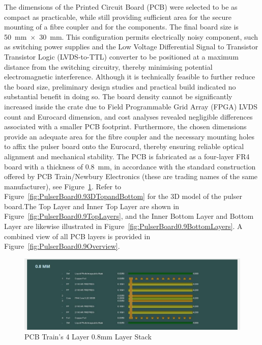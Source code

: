 \documentclass[a4paper,11pt]{article}
\begin{document}
The dimensions of the Printed Circuit Board (PCB) were selected to be as compact as practicable, while still providing sufficient area for the secure mounting of a fibre coupler and for the components. The final board size is 50~mm~$\times$~30~mm. This configuration permits electrically noisy component, such as switching power supplies and the Low Voltage Differential Signal to Transistor Transistor Logic (LVDS-to-TTL) converter to be positioned at a maximum distance from the switching circuitry, thereby minimising potential electromagnetic interference.
Although it is technically feasible to further reduce the board size, preliminary design studies and practical build indicated no substantial benefit in doing so. The board density cannot be significantly increased inside the crate due to Field Programmable Grid Array (FPGA) LVDS count and Eurocard dimension, and cost analyses revealed negligible differences associated with a smaller PCB footprint. Furthermore, the chosen dimensions provide an adequate area for the fibre coupler and the necessary mounting holes to affix the pulser board onto the Eurocard, thereby ensuring reliable optical alignment and mechanical stability.
The PCB is fabricated as a four-layer FR4  \cite{FR-4}  board with a thickness of 0.8~mm, in accordance with the standard construction offered by PCB Train/Newbury Electronics (these are trading names of the same manufacturer), see Figure~\ref{fig:PCBTrain0.84layer}. Refer to Figure~\ref{fig:PulserBoard0.93DTopandBottom} for the 3D model of the pulser board.The Top Layer and Inner Top Layer are shown in Figure~\ref{fig:PulserBoard0.9TopLayers}, and the Inner Bottom Layer and Bottom Layer are likewise illustrated in Figure~\ref{fig:PulserBoard0.9BottomLayers}. A combined view of all PCB layers is provided in Figure~\ref{fig:PulserBoard0.9Overview}.


\begin{figure}[htbp]
\centering
\includegraphics[scale=0.5]{PCBTrain0.84layer.png}
\caption{PCB Train's 4 Layer 0.8mm Layer Stack\label{fig:PCBTrain0.84layer}}
\end{figure}
\end{document}
